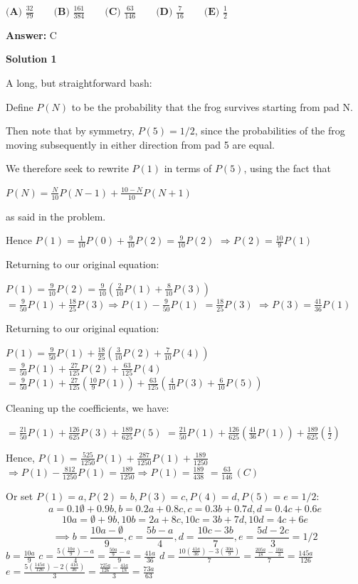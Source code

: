 \begin{enumerate}
 $\textbf{(A) }\frac{32}{79}\qquad \textbf{(B) }\frac{161}{384}\qquad \textbf{(C) }\frac{63}{146}\qquad \textbf{(D) }\frac{7}{16}\qquad \textbf{(E) }\frac{1}{2}\qquad$

 \textbf{Answer: }C



\textbf{Solution 1}

A long, but straightforward bash:

 Define $P(N)$ to be the probability that the frog survives starting from pad N.

 Then note that by symmetry, $P(5) = 1/2$, since the probabilities of the frog moving subsequently in either direction from pad 5 are equal.

 We therefore seek to rewrite $P(1)$ in terms of $P(5)$, using the fact that

 $P(N) = \frac {N} {10}P(N - 1) + \frac {10 - N} {10}P(N + 1)$

 as said in the problem.

 Hence $P(1) = \frac {1} {10}P(0) + \frac {9} {10}P(2) = \frac {9} {10}P(2)$
$\Rightarrow P(2) = \frac {10} {9}P(1)$

 Returning to our original equation:

 $P(1) = \frac {9} {10}P(2) = \frac {9} {10}\left(\frac{2} {10}P(1) + \frac{8} {10}P(3)\right)$
$= \frac {9} {50}P(1) + \frac {18} {25}P(3) \Rightarrow P(1) - \frac {9} {50}P(1)$ $= \frac {18} {25}P(3)$
$\Rightarrow P(3) = \frac {41} {36}P(1)$

 Returning to our original equation:

 $P(1) = \frac {9} {50}P(1) + \frac {18} {25}\left(\frac {3} {10}P(2) + \frac {7} {10}P(4)\right)$
$= \frac {9} {50}P(1) + \frac {27} {125}P(2) + \frac {63} {125}P(4)$
$= \frac {9} {50}P(1) + \frac {27} {125}\left(\frac {10} {9}P(1)\right) + \frac {63} {125}\left(\frac {4} {10}P(3) + \frac {6} {10}P(5)\right)$

 Cleaning up the coefficients, we have: 

 $= \frac {21} {50}P(1) + \frac {126} {625}P(3) + \frac {189} {625}P(5)$
$= \frac {21} {50}P(1) + \frac {126} {625}\left(\frac {41} {36}P(1)\right) + \frac {189} {625}\left(\frac {1} {2}\right)$

 Hence, $P(1) = \frac {525} {1250}P(1) + \frac {287} {1250}P(1) + \frac {189} {1250}$
$\Rightarrow P(1) - \frac {812} {1250}P(1) = \frac {189} {1250} \Rightarrow P(1) = \frac {189} {438}$
$= \boxed{\frac {63} {146}\, (C)}$

 Or set $P(1)=a,P(2)=b,P(3)=c,P(4)=d,P(5)=e=1/2$:
 \[a=0.1\emptyset+0.9b,b=0.2a+0.8c,c=0.3b+0.7d,d=0.4c+0.6e\]
 \[10a=\emptyset+9b,10b=2a+8c,10c=3b+7d,10d=4c+6e\]
 \[\implies b=\frac{10a-\emptyset}{9},c=\frac{5b-a}{4},d=\frac{10c-3b}{7},e=\frac{5d-2c}{3}=1/2\]$b=\frac{10a}{9}$
$c=\frac{5\left(\frac{10a}{9}\right)-a}{4}=\frac{\frac{50a}{9}-a}{9}=\frac{41a}{36}$
$d=\frac{10\left(\frac{41a}{36}\right)-3\left(\frac{30a}{9}\right)}{7}=\frac{\frac{205a}{18}-\frac{10a}{3}}{7}=\frac{145a}{126}$
$e=\frac{5\left(\frac{145a}{126}\right)-2\left(\frac{41a}{36}\right)}{3}=\frac{\frac{725a}{126}-\frac{41a}{18}}{3}=\frac{73a}{63}$


\end{enumerate}
